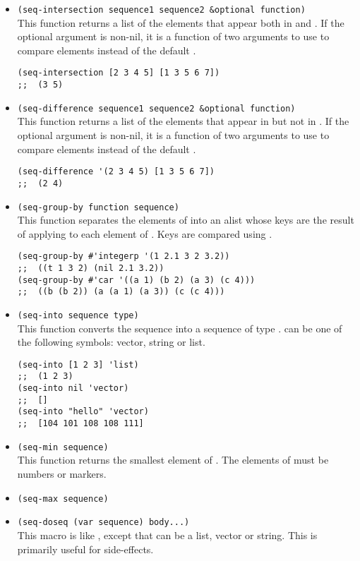 \begin{itemize}
\item \lstinline|(seq-intersection sequence1 sequence2 &optional function)|\\
  This function returns a list of the elements that appear both in  and .
  If the optional argument  is non-nil, it is a function of two arguments to use to compare elements instead of the default .
\begin{lstlisting}
(seq-intersection [2 3 4 5] [1 3 5 6 7])
;;  (3 5)
\end{lstlisting}


  
\item \lstinline|(seq-difference sequence1 sequence2 &optional function)|\\
  This function returns a list of the elements that appear in  but not in .
  If the optional argument  is non-nil, it is a function of two arguments to use to compare elements instead of the default .
\begin{lstlisting}
(seq-difference '(2 3 4 5) [1 3 5 6 7])
;;  (2 4)
\end{lstlisting}


\item \lstinline|(seq-group-by function sequence)|\\
  This function separates the elements of  into an alist whose keys are the result of applying  to each element of .
  Keys are compared using .
\begin{lstlisting}
(seq-group-by #'integerp '(1 2.1 3 2 3.2))
;;  ((t 1 3 2) (nil 2.1 3.2))
(seq-group-by #'car '((a 1) (b 2) (a 3) (c 4))) 
;;  ((b (b 2)) (a (a 1) (a 3)) (c (c 4)))
\end{lstlisting}

  
\item \lstinline|(seq-into sequence type)|\\
  This function converts the sequence  into a sequence of type .
   can be one of the following symbols: vector, string or list.
\begin{lstlisting}
(seq-into [1 2 3] 'list)
;;  (1 2 3)
(seq-into nil 'vector)
;;  []
(seq-into "hello" 'vector)
;;  [104 101 108 108 111]
\end{lstlisting}

  
\item \lstinline|(seq-min sequence)|\\
  This function returns the smallest element of .
  The elements of  must be numbers or markers.
\item \lstinline|(seq-max sequence)|
\item \lstinline|(seq-doseq (var sequence) body...)|\\
  This macro is like , except that  can be a list, vector or string.
  This is primarily useful for side-effects.


\end{itemize}

